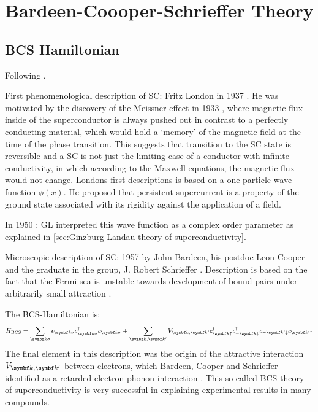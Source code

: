 \documentclass[../notes.tex]{subfiles}
\begin{document}
\section{Bardeen-Coooper-Schrieffer Theory}\label{sec:bcs-theory}

\subsection{BCS Hamiltonian}

Following \cite[ch. 14]{colemanIntroductionManyBodyPhysics2015}.

First phenomenological description of SC: Fritz London in 1937 \cite{londonNewConceptionSupraconductivity1937}.
He was motivated by the discovery of the Meissner effect in 1933 \cite{meissnerNeuerEffektBei1933}, where magnetic flux inside of the superconductor is always pushed out in contrast to a perfectly conducting material, which would hold a `memory' of the magnetic field at the time of the phase transition. 
This suggests that transition to the SC state is reversible and a SC is not just the limiting case of a conductor with infinite conductivity, in which according to the Maxwell equations, the magnetic flux would not change.
Londons first descriptions is based on a one-particle wave function \(\phi (x)\).
He proposed that persistent supercurrent is a property of the ground state associated with its rigidity against the application of a field.

In 1950 \cite{landauTheorySuperconductivity1965}: GL interpreted this wave function as a complex order parameter as explained in \cref{sec:Ginzburg-Landau theory of superconductivity}.

Microscopic description of SC: 1957 by John Bardeen, his postdoc Leon Cooper and the graduate in the group, J. Robert Schrieffer \cite{bardeenTheorySuperconductivity1957}.
Description is based on the fact that the Fermi sea is unstable towards development of bound pairs under arbitrarily small attraction \cite{cooperBoundElectronPairs1956}.


The BCS-Hamiltonian is:
\begin{equation}\label{eq:BCS Hamiltonian}
	H_{\text{BCS}} = \sum_{\vb{k}\sigma} \epsilon_{\vb{k}\sigma} c_{\vb{k}\sigma}^{\dagger} c_{\vb{k}\sigma} + \sum_{\vb{k}, \vb{k}^{\prime}} V_{\vb{k}, \vb{k}^{\prime}} c_{\vb{k}\uparrow}^{\dagger} c_{-\vb{k}\downarrow}^{\dagger} c_{-\vb{k}^{\prime}\downarrow} c_{\vb{k}^{\prime}\uparrow}
\end{equation}
The final element in this description was the origin of the attractive interaction \(V_{{\vb{k}, \vb{k}^{\prime}}}\) between electrons, which Bardeen, Cooper and Schrieffer identified as a retarded electron-phonon interaction \cite{bardeenTheorySuperconductivity1957}.
This so-called BCS-theory of superconductivity is very successful in explaining experimental results in many compounds.
\end{document}
